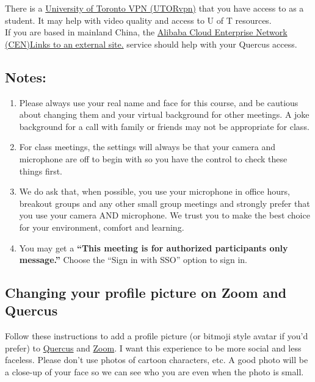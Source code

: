 \documentclass[
  openany]{book}
\begin{document}
There is a \href{https://isea.utoronto.ca/services/vpn/utorvpn/}{University of Toronto VPN (UTORvpn)} that you have access to as a student. It may help with video quality and access to U of T resources.\\
If you are based in mainland China, the \href{https://onesearch.library.utoronto.ca/ic-faq-categories/alibaba-cloud-enterprise-network-cen-service}{Alibaba Cloud Enterprise Network (CEN)Links to an external site.} service should help with your Quercus access.

\hypertarget{notes}{%
\subsection{Notes:}\label{notes}}

\begin{enumerate}
\def\labelenumi{\arabic{enumi}.}
\item
  Please always use your real name and face for this course, and be cautious about changing them and your virtual background for other meetings. A joke background for a call with family or friends may not be appropriate for class.
\item
  For class meetings, the settings will always be that your camera and microphone are off to begin with so you have the control to check these things first.
\item
  We do ask that, when possible, you use your microphone in office hours, breakout groups and any other small group meetings and strongly prefer that you use your camera AND microphone. We trust you to make the best choice for your environment, comfort and learning.
\item
  You may get a \textbf{``This meeting is for authorized participants only message.''} Choose the ``Sign in with SSO'' option to sign in.
\end{enumerate}

\hypertarget{changing-your-profile-picture-on-zoom-and-quercus}{%
\subsection{Changing your profile picture on Zoom and Quercus}\label{changing-your-profile-picture-on-zoom-and-quercus}}

Follow these instructions to add a profile picture (or bitmoji style avatar if you'd prefer) to \href{https://community.canvaslms.com/docs/DOC-10599-4212710334}{Quercus} and \href{https://support.zoom.us/hc/en-us/articles/201363203-Customizing-your-profile}{Zoom}. I want this experience to be more social and less faceless. Please don't use photos of cartoon characters, etc. A good photo will be a close-up of your face so we can see who you are even when the photo is small.
\end{document}
